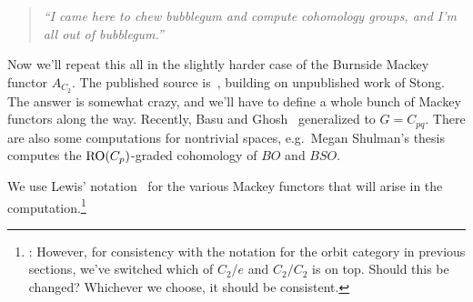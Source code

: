 \begin{quote}\textit{
	``I came here to chew bubblegum and compute cohomology groups, and I'm all out of bubblegum.''
}\end{quote}
\label{burncomp}
Now we'll repeat this all in the slightly harder case of the Burnside Mackey functor $A_{C_2}$. The published
source is~\cite{Lew88}, building on unpublished work of Stong. The answer is somewhat crazy, and we'll have to
define a whole bunch of Mackey functors along the way. Recently, Basu and Ghosh~\cite{BasuGhosh} generalized to $G
= C_{pq}$. There are also some computations for nontrivial spaces, e.g.\ Megan Shulman's
thesis~\cite{MeganShulmanThesis} computes the $\mathrm{RO}(C_p)$-graded cohomology of $\mathit{BO}$ and
$\mathit{BSO}$.
\begin{beast}
We use Lewis' notation~\cite{Lew88} for the various Mackey functors that will arise in the
computation.\footnote{\TODO: However, for consistency with the notation for the orbit category in previous
sections, we've switched which of $C_2/e$ and $C_2/C_2$ is on top. Should this be changed? Whichever we choose, it
should be consistent.}
\label{best_bestiary}
\end{beast}
